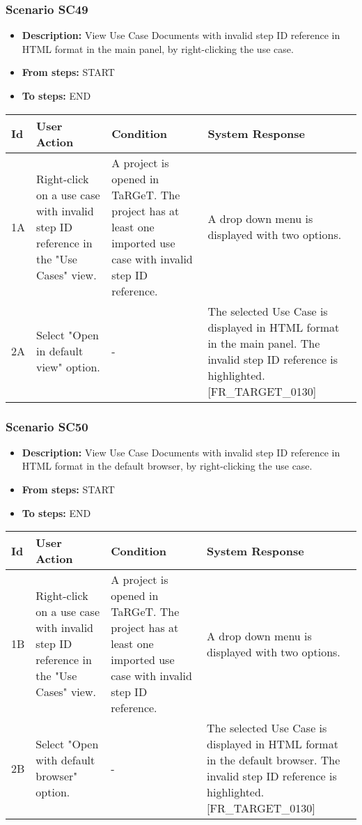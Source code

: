 \documentclass[a4paper,11pt]{article}
\newcommand{\bl}{\\ \hline}
\begin{document}
\subsubsection*{Scenario SC49}
\begin{itemize}
\item {\bf Description:} View Use Case Documents with invalid step ID reference
					in HTML format in the main panel, by right-clicking the use case.
				
\item {\bf From steps:} START
\item {\bf To steps:} END
\end{itemize}
\begin{tabular}{|p{0.4in}|p{1.5in}|p{1.5in}|p{1.5in}|}
\hline
Id & User Action & Condition & System Response \bl 
1A & Right-click on a use case with invalid step ID reference in
						the "Use Cases" view. & A project is opened in TaRGeT. The project has at least
						one imported use case with invalid step ID reference. & A drop down menu is displayed with two options.
					\bl
2A & Select "Open in default view" option. & - & The selected Use Case is displayed in HTML format in the
						main panel. The invalid step ID reference is highlighted.
						[FR_TARGET_0130] \bl
\end{tabular}
\subsubsection*{Scenario SC50}
\begin{itemize}
\item {\bf Description:} View Use Case Documents with invalid step ID reference
					in HTML format in the default browser, by right-clicking the use
					case.
\item {\bf From steps:} START
\item {\bf To steps:} END
\end{itemize}
\begin{tabular}{|p{0.4in}|p{1.5in}|p{1.5in}|p{1.5in}|}
\hline
Id & User Action & Condition & System Response \bl 
1B & Right-click on a use case with invalid step ID reference in
						the "Use Cases" view. & A project is opened in TaRGeT. The project has at least
						one imported use case with invalid step ID reference. & A drop down menu is displayed with two options.
					\bl
2B & Select "Open with default browser" option. & - & The selected Use Case is displayed in HTML format in the
						default browser. The invalid step ID reference is highlighted.
						[FR_TARGET_0130]\bl
\end{tabular}
\end{document}
